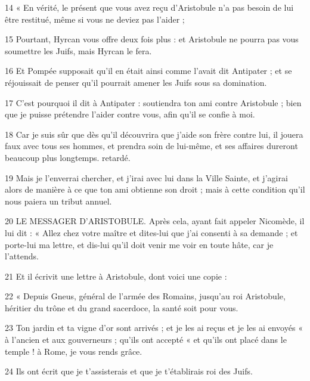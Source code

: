 \par 14 « En vérité, le présent que vous avez reçu d'Aristobule n'a pas besoin de lui être restitué, même si vous ne deviez pas l'aider ;

\par 15 Pourtant, Hyrcan vous offre deux fois plus : et Aristobule ne pourra pas vous soumettre les Juifs, mais Hyrcan le fera.

\par 16 Et Pompée supposait qu'il en était ainsi comme l'avait dit Antipater ; et se réjouissait de penser qu'il pourrait amener les Juifs sous sa domination.

\par 17 C'est pourquoi il dit à Antipater : soutiendra ton ami contre Aristobule ; bien que je puisse prétendre l'aider contre vous, afin qu'il se confie à moi.

\par 18 Car je suis sûr que dès qu'il découvrira que j'aide son frère contre lui, il jouera faux avec tous ses hommes, et prendra soin de lui-même, et ses affaires dureront beaucoup plus longtemps. retardé.

\par 19 Mais je l'enverrai chercher, et j'irai avec lui dans la Ville Sainte, et j'agirai alors de manière à ce que ton ami obtienne son droit ; mais à cette condition qu’il nous paiera un tribut annuel.

\par 20 LE MESSAGER D'ARISTOBULE. Après cela, ayant fait appeler Nicomède, il lui dit : « Allez chez votre maître et dites-lui que j'ai consenti à sa demande ; et porte-lui ma lettre, et dis-lui qu'il doit venir me voir en toute hâte, car je l'attends.

\par 21 Et il écrivit une lettre à Aristobule, dont voici une copie :

\par 22 « Depuis Gneus, général de l'armée des Romains, jusqu'au roi Aristobule, héritier du trône et du grand sacerdoce, la santé soit pour vous.

\par 23 Ton jardin et ta vigne d'or sont arrivés ; et je les ai reçus et je les ai envoyés « à l'ancien et aux gouverneurs ; qu'ils ont accepté « et qu'ils ont placé dans le temple ! à Rome, je vous rends grâce.

\par 24 Ils ont écrit que je t'assisterais et que je t'établirais roi des Juifs.

